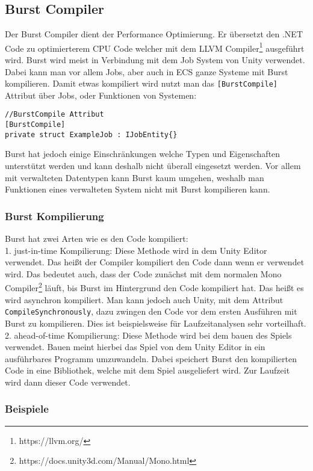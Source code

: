 \subsection{Burst Compiler} \label{burst}
Der Burst Compiler dient der Performance Optimierung. Er übersetzt den .NET Code zu optimierterem CPU Code welcher mit dem LLVM Compiler\footnote{https://llvm.org/} ausgeführt wird. Burst wird meist in Verbindung mit dem Job System von Unity verwendet. Dabei kann man vor allem Jobs, aber auch in ECS ganze Systeme mit Burst kompilieren. Damit etwas kompiliert wird nutzt man das \texttt{[BurstCompile]} Attribut über Jobs, oder Funktionen von Systemen:
\begin{lstlisting}[style=code, caption={BurstCompile Attribut, um Burst zu verwenden}]
//BurstCompile Attribut
[BurstCompile]
private struct ExampleJob : IJobEntity{}
\end{lstlisting}
Burst hat jedoch einige Einschränkungen welche Typen und Eigenschaften unterstützt werden und kann deshalb nicht überall eingesetzt werden. Vor allem mit verwalteten Datentypen kann Burst kaum umgehen, weshalb man Funktionen eines verwalteten System nicht mit Burst kompilieren kann.
\subsubsection{Burst Kompilierung}
Burst hat zwei Arten wie es den Code kompiliert:\\
1. just-in-time Kompilierung: Diese Methode wird in dem Unity Editor verwendet. Das heißt der Compiler kompiliert den Code dann wenn er verwendet wird. Das bedeutet auch, dass der Code zunächst mit dem normalen Mono Compiler\footnote{https://docs.unity3d.com/Manual/Mono.html} läuft, bis Burst im Hintergrund den Code kompiliert hat. Das heißt es wird asynchron kompiliert. Man kann jedoch auch Unity, mit dem Attribut \texttt{CompileSynchronously}, dazu zwingen den Code vor dem ersten Ausführen mit Burst zu kompilieren. Dies ist beispielsweise für Laufzeitanalysen sehr vorteilhaft.\\
2. ahead-of-time Kompilierung: Diese Methode wird bei dem bauen des Spiels verwendet. Bauen meint hierbei das Spiel von dem Unity Editor in ein ausführbares Programm umzuwandeln. Dabei speichert Burst den kompilierten Code in eine Bibliothek, welche mit dem Spiel ausgeliefert wird. Zur Laufzeit wird dann dieser Code verwendet.
\subsubsection{Beispiele}